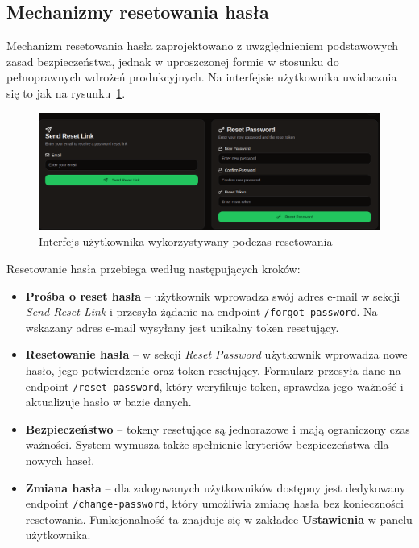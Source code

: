 \subsection{Mechanizmy resetowania hasła}

Mechanizm resetowania hasła zaprojektowano z uwzględnieniem podstawowych zasad bezpieczeństwa, jednak w uproszczonej formie w stosunku do pełnoprawnych wdrożeń produkcyjnych. Na interfejsie użytkownika uwidacznia się to jak na rysunku~\ref{fig:ui_password_reset}.
\begin{figure}[ht]
    \centering
    \includegraphics[width=0.95\linewidth]{rys03/pass_resert}
    \caption{Interfejs użytkownika wykorzystywany podczas resetowania}
    \label{fig:ui_password_reset}
\end{figure}

\noindent Resetowanie hasła przebiega według następujących kroków:
\begin{itemize}
    \item \textbf{Prośba o reset hasła} -- użytkownik wprowadza swój adres e-mail w sekcji \emph{Send Reset Link} i przesyła żądanie na endpoint \texttt{/forgot-password}. Na wskazany adres e-mail wysyłany jest unikalny token resetujący.
    
    \item \textbf{Resetowanie hasła} -- w sekcji \emph{Reset Password} użytkownik wprowadza nowe hasło, jego potwierdzenie oraz token resetujący. Formularz przesyła dane na endpoint \texttt{/reset-password}, który weryfikuje token, sprawdza jego ważność i aktualizuje hasło w bazie danych.
    
    \item \textbf{Bezpieczeństwo} -- tokeny resetujące są jednorazowe i mają ograniczony czas ważności. System wymusza także spełnienie kryteriów bezpieczeństwa dla nowych haseł.
    
    \item \textbf{Zmiana hasła} -- dla zalogowanych użytkowników dostępny jest dedykowany endpoint \texttt{/change-password}, który umożliwia zmianę hasła bez konieczności resetowania. Funkcjonalność ta znajduje się w zakładce \textbf{Ustawienia} w panelu użytkownika.
\end{itemize}

